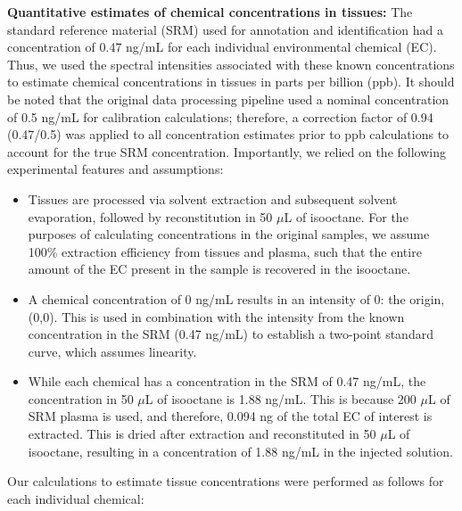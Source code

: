\newpage



\vspace{0.5em}

\noindent \textbf{Quantitative estimates of chemical concentrations in tissues:} The standard reference material (SRM) used for annotation and identification had a concentration of 0.47 ng/mL for each individual environmental chemical (EC). Thus, we used the spectral intensities associated with these known concentrations to estimate chemical concentrations in tissues in parts per billion (ppb). It should be noted that the original data processing pipeline used a nominal concentration of 0.5 ng/mL for calibration calculations; therefore, a correction factor of 0.94 (0.47/0.5) was applied to all concentration estimates prior to ppb calculations to account for the true SRM concentration. Importantly, we relied on the following experimental features and assumptions:

\begin{itemize}
\item Tissues are processed via solvent extraction and subsequent solvent evaporation, followed by reconstitution in 50 $\mu$L of isooctane. For the purposes of calculating concentrations in the original samples, we assume 100\% extraction efficiency from tissues and plasma, such that the entire amount of the EC present in the sample is recovered in the isooctane.
\item A chemical concentration of 0 ng/mL results in an intensity of 0: the origin, (0,0). This is used in combination with the intensity from the known concentration in the SRM (0.47 ng/mL) to establish a two-point standard curve, which assumes linearity.
\item While each chemical has a concentration in the SRM of 0.47 ng/mL, the concentration in 50 $\mu$L of isooctane is 1.88 ng/mL. This is because 200 $\mu$L of SRM plasma is used, and therefore, 0.094 ng of the total EC of interest is extracted. This is dried after extraction and reconstituted in 50 $\mu$L of isooctane, resulting in a concentration of 1.88 ng/mL in the injected solution.
\end{itemize}

\noindent Our calculations to estimate tissue concentrations were performed as follows for each individual chemical:

